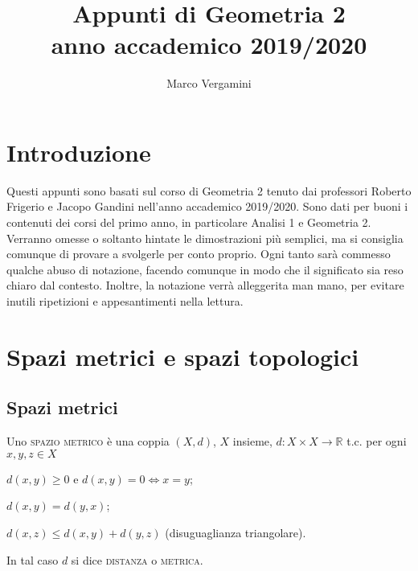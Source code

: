 \documentclass{article}
\title{Appunti di Geometria 2 \\ anno accademico 2019/2020}
\date{}
\author{Marco Vergamini}
\begin{document}
\maketitle
\newpage
\tableofcontents
\newpage

\section{Introduzione}
Questi appunti sono basati sul corso di Geometria 2 tenuto dai professori
Roberto Frigerio e Jacopo Gandini nell'anno accademico 2019/2020. Sono dati per
buoni i contenuti dei corsi del primo anno, in particolare Analisi 1 e Geometria
2. Verranno omesse o soltanto hintate le dimostrazioni più semplici, ma si
consiglia comunque di provare a svolgerle per conto proprio. Ogni tanto sarà
commesso qualche abuso di notazione, facendo comunque in modo che il significato
sia reso chiaro dal contesto. Inoltre, la notazione verrà alleggerita man mano,
per evitare inutili ripetizioni e appesantimenti nella lettura.

\section{Spazi metrici e spazi topologici}
\subsection{Spazi metrici}
\begin{defn}
	Uno \textsc{spazio metrico} è una coppia $(X, d)$, $X$ insieme,
	${d: X \times X \rightarrow \mathbb{R}}$ t.c. per ogni ${x, y, z \in X}$
    \begin{nlist}
	\item $d(x, y) \ge 0$ e $d(x, y)=0 \Leftrightarrow x=y$;
	\item $d(x, y)=d(y, x)$;
	\item $d(x, z) \le d(x, y)+d(y,z)$ (disuguaglianza triangolare).
    \end{nlist}
	In tal caso $d$ si dice \textsc{distanza} o \textsc{metrica}.
\end{defn}
\end{document}

